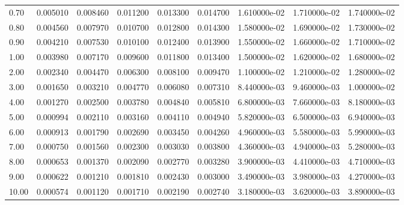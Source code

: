 \begin{tabular}{lrrrrrrrr}
0.70  &  0.005010 &  0.008460 &  0.011200 &  0.013300 &  0.014700 &  1.610000e-02 &  1.710000e-02 &  1.740000e-02 \\
0.80  &  0.004560 &  0.007970 &  0.010700 &  0.012800 &  0.014300 &  1.580000e-02 &  1.690000e-02 &  1.730000e-02 \\
0.90  &  0.004210 &  0.007530 &  0.010100 &  0.012400 &  0.013900 &  1.550000e-02 &  1.660000e-02 &  1.710000e-02 \\
1.00  &  0.003980 &  0.007170 &  0.009600 &  0.011800 &  0.013400 &  1.500000e-02 &  1.620000e-02 &  1.680000e-02 \\
2.00  &  0.002340 &  0.004470 &  0.006300 &  0.008100 &  0.009470 &  1.100000e-02 &  1.210000e-02 &  1.280000e-02 \\
3.00  &  0.001650 &  0.003210 &  0.004770 &  0.006080 &  0.007310 &  8.440000e-03 &  9.460000e-03 &  1.000000e-02 \\
4.00  &  0.001270 &  0.002500 &  0.003780 &  0.004840 &  0.005810 &  6.800000e-03 &  7.660000e-03 &  8.180000e-03 \\
5.00  &  0.000994 &  0.002110 &  0.003160 &  0.004110 &  0.004940 &  5.820000e-03 &  6.500000e-03 &  6.940000e-03 \\
6.00  &  0.000913 &  0.001790 &  0.002690 &  0.003450 &  0.004260 &  4.960000e-03 &  5.580000e-03 &  5.990000e-03 \\
7.00  &  0.000750 &  0.001560 &  0.002300 &  0.003030 &  0.003800 &  4.360000e-03 &  4.940000e-03 &  5.280000e-03 \\
8.00  &  0.000653 &  0.001370 &  0.002090 &  0.002770 &  0.003280 &  3.900000e-03 &  4.410000e-03 &  4.710000e-03 \\
9.00  &  0.000622 &  0.001210 &  0.001810 &  0.002430 &  0.003000 &  3.490000e-03 &  3.980000e-03 &  4.270000e-03 \\
10.00 &  0.000574 &  0.001120 &  0.001710 &  0.002190 &  0.002740 &  3.180000e-03 &  3.620000e-03 &  3.890000e-03 \\
\bottomrule
\end{tabular}
